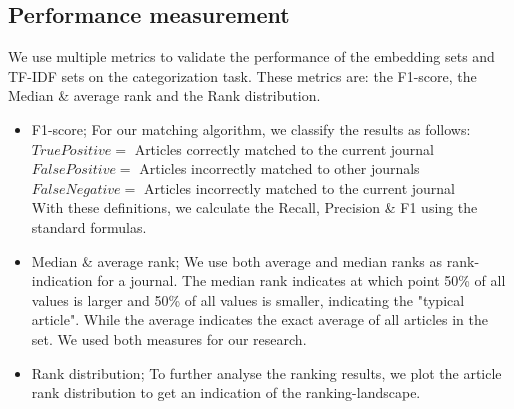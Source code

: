 \documentclass[../../paper.tex]{subfiles}
\begin{document}
\subsection{Performance measurement}
We use multiple metrics to validate the performance of the embedding sets and TF-IDF sets on the categorization task. These metrics are: the F1-score, the Median \& average rank and the Rank distribution.
\begin{itemize}
\item{F1-score;
For our matching algorithm, we classify the results as follows:
$True Positive = $ Articles correctly matched to the current journal\\
$False Positive = $ Articles incorrectly matched to other journals\\
$False Negative = $ Articles incorrectly matched to the current journal\\
With these definitions, we calculate the Recall, Precision \& F1 using the standard formulas.}
\item{Median \& average rank;
We use both average and median ranks as rank-indication for a journal. The median rank indicates at which point 50\% of all values is larger and 50\% of all values is smaller, indicating the "typical article". While the average indicates the exact average of all articles in the set. We used both measures for our research.}
\item{Rank distribution;
To further analyse the ranking results, we plot the article rank distribution to get an indication of the ranking-landscape.}
\end{itemize}
\end{document}

